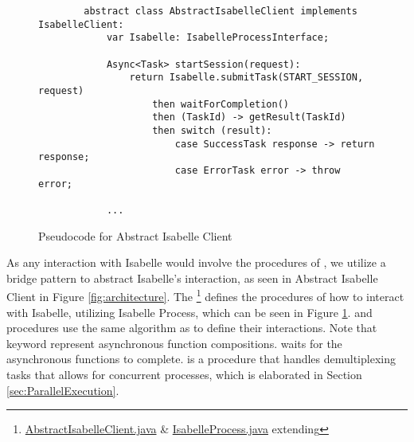 \begin{figure}[!htb]
    \begin{lstlisting}
        abstract class AbstractIsabelleClient implements IsabelleClient:
            var Isabelle: IsabelleProcessInterface;
        
            Async<Task> startSession(request):
                return Isabelle.submitTask(START_SESSION, request)
                    then waitForCompletion()
                    then (TaskId) -> getResult(TaskId)
                    then switch (result):
                        case SuccessTask response -> return response;
                        case ErrorTask error -> throw error;
            
            ...
    \end{lstlisting}

    \caption{Pseudocode for Abstract Isabelle Client}
    \label{fig:AbstractIsabelleClient}
\end{figure}

As any interaction with Isabelle would involve the procedures of , we utilize a bridge pattern to abstract Isabelle's 
interaction, as seen in Abstract Isabelle Client in Figure \ref{fig:architecture}. The \footnote{\href{https://github.com/achmadafriza/veritest-dev/blob/master/src/main/java/com/veriopt/veritest/isabelle/AbstractIsabelleClient.java}{AbstractIsabelleClient.java} \& \href{https://github.com/achmadafriza/veritest-dev/blob/master/src/main/java/com/veriopt/veritest/isabelle/IsabelleProcess.java}{IsabelleProcess.java} extending } 
defines the procedures of how to interact with Isabelle, utilizing Isabelle Process, which can be seen in Figure \ref{fig:AbstractIsabelleClient}. 
 and  procedures use the same algorithm as  to define their interactions.
Note that  keyword represent asynchronous function compositions.  waits for the 
asynchronous functions to complete.  is a procedure that handles demultiplexing tasks that allows for concurrent 
processes, which is elaborated in Section \ref{sec:ParallelExecution}.

